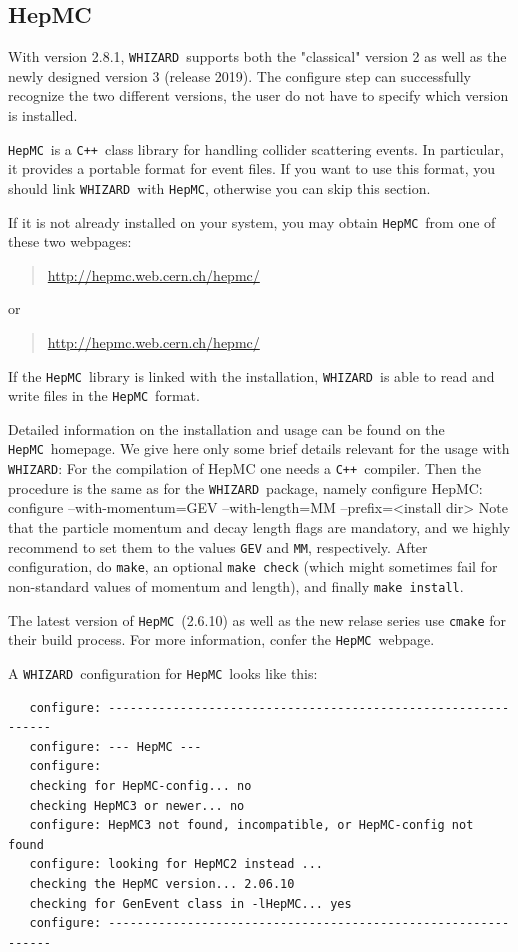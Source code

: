 \documentclass[12pt]{book}
\newenvironment{interaction}%
  {\begingroup\small
   \Verbatim}%
  {\endVerbatim
   \endgroup\noindent}
\newcommand{\ttt}[1]{\texttt{#1}}
\newcommand{\whizard}{\ttt{WHIZARD}}
\newcommand{\hepmc}{\ttt{HepMC}}
\newcommand{\cpp}{\ttt{C++}}
\begin{document}

\subsection{HepMC}
\label{sec:hepmc}

With version 2.8.1, \whizard\ supports both the "classical" version 2
as well as the newly designed version 3 (release 2019). The configure
step can successfully recognize the two  different versions, the user
do not have to specify which version is installed.

\hepmc\ is a \cpp\ class library for handling collider scattering
events.  In particular, it provides a portable format for event files.
If you want to use this format, you should link \whizard\ with \hepmc,
otherwise you can skip this section.

If it is not already installed on your system, you may obtain
\hepmc\ from one of these two webpages:
\begin{quote}
  \url{http://hepmc.web.cern.ch/hepmc/}
\end{quote}
or
\begin{quote}
  \url{http://hepmc.web.cern.ch/hepmc/}
\end{quote}
If the \hepmc\ library is linked with the installation, \whizard\ is
able to read and write files in the \hepmc\ format.

Detailed information on the installation and usage can be found on the
\hepmc\ homepage. We give here only some brief details relevant for
the usage with \whizard: For the compilation of HepMC one needs a
\cpp\ compiler. Then the procedure is the same as for the
\whizard\ package, namely configure HepMC:
\begin{interaction}
  configure --with-momentum=GEV --with-length=MM --prefix=<install dir>
\end{interaction}
Note that the particle momentum and decay length flags are mandatory, and
we highly recommend to set them to the values \ttt{GEV} and \ttt{MM},
respectively. After configuration, do \ttt{make}, an optional
\ttt{make check} (which might sometimes fail for non-standard values
of momentum and length), and finally \ttt{make install}.

The latest version of \hepmc\ (2.6.10) as well as the new relase
series use \texttt{cmake} for their build process. For more
information, confer the \hepmc\ webpage.

A \whizard\ configuration for \hepmc\ looks like this:
\begin{footnotesize}
  \begin{verbatim}
   configure: --------------------------------------------------------------
   configure: --- HepMC ---
   configure:
   checking for HepMC-config... no
   checking HepMC3 or newer... no
   configure: HepMC3 not found, incompatible, or HepMC-config not found
   configure: looking for HepMC2 instead ...
   checking the HepMC version... 2.06.10
   checking for GenEvent class in -lHepMC... yes
   configure: --------------------------------------------------------------
  \end{verbatim}
\end{footnotesize}
\end{document}
